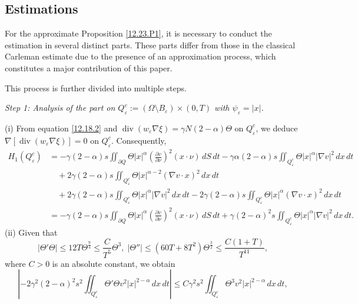 \documentclass[11pt]{article}
\numberwithin{equation}{section}
\DeclareMathOperator{\Div}{div}
\begin{document}
\subsection{Estimations}

  For the approximate Proposition \ref{12.23.P1}, it is necessary to conduct the estimation in several distinct parts. These parts differ from those in the classical Carleman estimate due to the presence of an approximation process, which constitutes a major contribution of this paper.

This process is further divided into multiple steps.

{\it Step 1: Analysis of the part on $Q_\varepsilon^c := (\Omega \setminus B_\varepsilon) \times (0,T)$ with $\psi_\varepsilon = |x|$.}

(i) From equation \eqref{12.18.2} and $\Div(w_\varepsilon \nabla \xi) = \gamma N(2 - \alpha) \Theta$ on $Q_\varepsilon^c$, we deduce $\nabla[\Div(w_\varepsilon \nabla \xi)] = 0$ on $Q_\varepsilon^c$. Consequently,
$$
\begin{aligned}
H_1(Q_\varepsilon^c)
&= -\gamma(2 - \alpha)s \iint_{\partial Q} \Theta |x|^\alpha \left(\frac{\partial v}{\partial \nu}\right)^2 (x \cdot \nu) \, dS \, dt - \gamma \alpha(2 - \alpha)s \iint_{Q_\varepsilon^c} \Theta |x|^\alpha |\nabla v|^2 \, dx \, dt \\
&\quad + 2\gamma (2 - \alpha)s \iint_{Q_\varepsilon^c} \Theta |x|^{\alpha - 2} (\nabla v \cdot x)^2 \, dx \, dt \\
&\quad + 2\gamma (2 - \alpha)s \iint_{Q_\varepsilon^c} \Theta |x|^\alpha |\nabla v|^2 \, dx \, dt - 2\gamma (2 - \alpha)s \iint_{Q_\varepsilon^c} \Theta |x|^\alpha (\nabla v \cdot x)^2 \, dx \, dt \\
&= -\gamma(2 - \alpha)s \iint_{\partial Q} \Theta |x|^\alpha \left(\frac{\partial v}{\partial \nu}\right)^2 (x \cdot \nu) \, dS \, dt + \gamma(2 - \alpha)^2s \iint_{Q_\varepsilon^c} \Theta |x|^\alpha |\nabla v|^2 \, dx \, dt.
\end{aligned}
$$
(ii) Given that
\begin{equation}\label{12.21.1}
|\Theta' \Theta| \leq 12T \Theta^{\frac{9}{4}} \leq \frac{C}{T^5} \Theta^3,  \;
|\Theta''| \leq (60T + 8T^2) \Theta^{\frac{3}{2}} \leq \frac{C(1 + T)}{T^{11}},
\end{equation}
where $C > 0$ is an absolute constant, we obtain
$$
\left| -2\gamma^2(2 - \alpha)^2s^2 \iint_{Q_\varepsilon^c} \Theta' \Theta v^2 |x|^{2 - \alpha} \, dx \, dt \right| \leq C\gamma^2s^2 \iint_{Q_\varepsilon^c} \Theta^3 v^2 |x|^{2 - \alpha} \, dx \, dt,
$$
\end{document}
